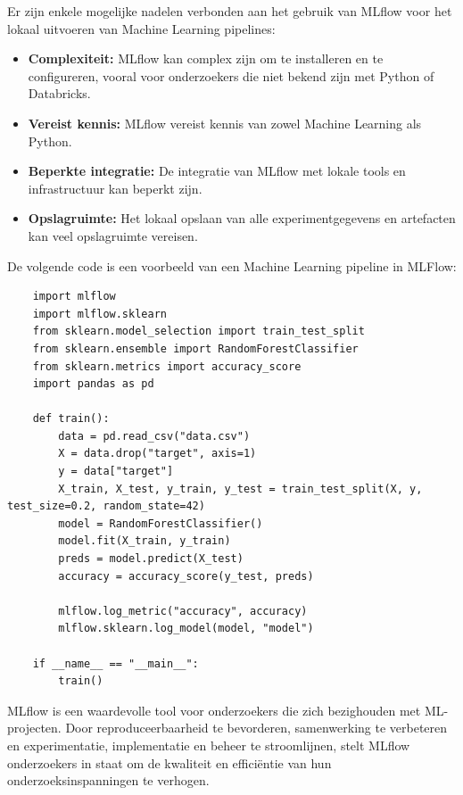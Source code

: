 Er zijn enkele mogelijke nadelen verbonden aan het gebruik van MLflow voor het lokaal uitvoeren van Machine Learning pipelines:

\begin{itemize}
    \item \textbf{Complexiteit:} MLflow kan complex zijn om te installeren en te configureren, vooral voor onderzoekers die niet bekend zijn met Python of Databricks.
    \item \textbf{Vereist kennis:} MLflow vereist kennis van zowel Machine Learning als Python.
    \item \textbf{Beperkte integratie:} De integratie van MLflow met lokale tools en infrastructuur kan beperkt zijn.
    \item \textbf{Opslagruimte:} Het lokaal opslaan van alle experimentgegevens en artefacten kan veel opslagruimte vereisen.
\end{itemize}

De volgende code is een voorbeeld van een Machine Learning pipeline in MLFlow:


\begin{verbatim}
    import mlflow
    import mlflow.sklearn
    from sklearn.model_selection import train_test_split
    from sklearn.ensemble import RandomForestClassifier
    from sklearn.metrics import accuracy_score
    import pandas as pd
    
    def train():
        data = pd.read_csv("data.csv")
        X = data.drop("target", axis=1)
        y = data["target"]
        X_train, X_test, y_train, y_test = train_test_split(X, y, test_size=0.2, random_state=42)
        model = RandomForestClassifier()
        model.fit(X_train, y_train)
        preds = model.predict(X_test)
        accuracy = accuracy_score(y_test, preds)
        
        mlflow.log_metric("accuracy", accuracy)
        mlflow.sklearn.log_model(model, "model")
    
    if __name__ == "__main__":
        train()
\end{verbatim}
MLflow is een waardevolle tool voor onderzoekers die zich bezighouden met ML-projecten. Door reproduceerbaarheid te bevorderen, samenwerking te verbeteren en experimentatie, implementatie en beheer te stroomlijnen, stelt MLflow onderzoekers in staat om de kwaliteit en efficiëntie van hun onderzoeksinspanningen te verhogen.
